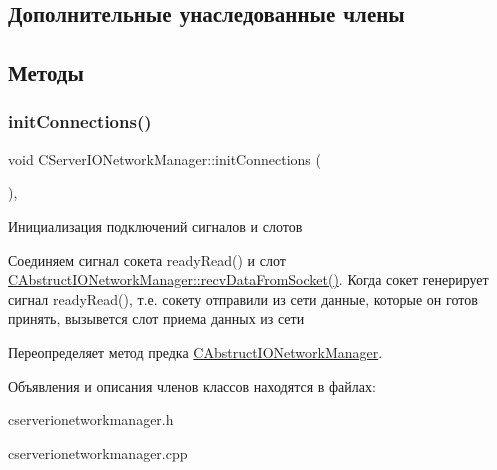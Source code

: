 \subsection*{Дополнительные унаследованные члены}


\subsection{Методы}
\hypertarget{class_c_server_i_o_network_manager_a17155570c51dc951db52d827f120c689}{}\label{class_c_server_i_o_network_manager_a17155570c51dc951db52d827f120c689} 
\subsubsection{\texorpdfstring{init\+Connections()}{initConnections()}}
{\footnotesize\ttfamily void C\+Server\+I\+O\+Network\+Manager\+::init\+Connections (\begin{DoxyParamCaption}{ }\end{DoxyParamCaption})\hspace{0.3cm}{\ttfamily [protected]}, {\ttfamily [virtual]}}



Инициализация подключений сигналов и слотов 

Соединяем сигнал сокета ready\+Read() и слот \hyperlink{class_c_abstruct_i_o_network_manager_a78756fc08ed619162da210a9cfc09208}{C\+Abstruct\+I\+O\+Network\+Manager\+::recv\+Data\+From\+Socket()}.  Когда сокет генерирует сигнал ready\+Read(), т.\+е. сокету отправили из сети данные, которые он готов принять, вызывется слот приема данных из сети

Переопределяет метод предка \hyperlink{class_c_abstruct_i_o_network_manager_ac01bfefacfa37050c8d3a9317a38fbf5}{C\+Abstruct\+I\+O\+Network\+Manager}.



Объявления и описания членов классов находятся в файлах\+:\begin{DoxyCompactItemize}
\item 
cserverionetworkmanager.\+h\item 
cserverionetworkmanager.\+cpp\end{DoxyCompactItemize}
